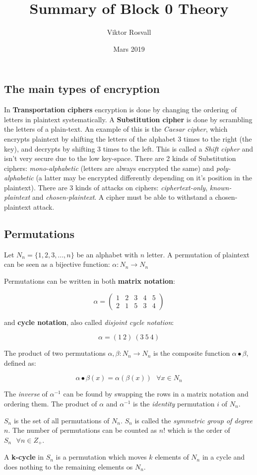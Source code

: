\documentclass{article}
\title{Summary of Block 0 Theory}
\author{Viktor Rosvall}
\date{Mars 2019}
\begin{document}
	\maketitle
	\subsection*{The main types of encryption}

	In \textbf{Transportation ciphers} encryption is done by changing the ordering of letters in plaintext systematically. A \textbf{Substitution cipher} is done by scrambling the letters of a plain-text. An example of this is the \textit{Caesar cipher}, which encrypts plaintext by shifting the letters of the alphabet 3 times to the right (the key), and decrypts by shifting 3 times to the left. This is called a \textit{Shift cipher} and isn't very secure due to the low key-space. There are 2 kinds of Substitution ciphers: \textit{mono-alphabetic} (letters are always encrypted the same) and \textit{poly-alphabetic} (a latter may be encrypted differently depending on it’s position in the plaintext). There are 3 kinds of attacks on ciphers: \textit{ciphertext-only}, \textit{known-plaintext} and \textit{chosen-plaintext}. A cipher must be able to withstand a chosen-plaintext attack. 
	
	\subsection*{Permutations}
	Let $ N_{n} = \{1,2,3,...,n\} $ be an alphabet with $n$ letter.
	A permutation of plaintext can be seen as a bijective function: $ \alpha : N_{n} \to N_{n} $ 
	

	Permutations can be written in both \textbf{matrix notation}:

	$$
	\alpha = 
	\begin{pmatrix}
	1 & 2 & 3 & 4 & 5 \\
	2 & 1 & 5 & 3 & 4
	\end{pmatrix}
	$$
	
	 and \textbf{cycle notation}, also called \textit{disjoint cycle notation}:
	
	$$
	\alpha = (1 \ 2) \ (3 \ 5 \ 4)
	$$
	
	The product of two permutations $\alpha, \beta : N_n \to N_n$ is the composite function $\alpha \bullet \beta$, defined as:
	
	$$
	\alpha \bullet \beta(x) = \alpha(\beta(x)) \ \ \ \forall x \in N_n
	$$
	
	The \textit{inverse} of $\alpha^{-1}$ can be found by swapping the rows in a matrix notation and ordering them. The product of $\alpha$ and $\alpha^{-1}$ is the \textit{identity} permutation $i$ of $N_n$.
	
	$S_n$ is the set of all permutations of $N_n$. $S_n$ is called the \textit{symmetric group of degree $n$}. The number of permutations can be counted as $n!$ which is the order of $S_n \ \ \ \forall n \in Z_+$.
	
	A \textbf{k-cycle} in $S_n$ is a permutation which moves $k$ elements of $N_n$ in a cycle and does nothing to the remaining elements os $N_n$.
\end{document}

